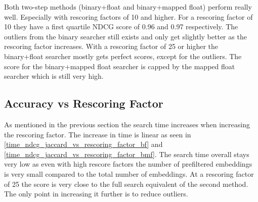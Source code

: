 Both two-step methods (binary+float and binary+mapped float) perform really well. Especially with rescoring factors of 10 and higher. For a rescoring factor of 10 they have a first quartile NDCG score of 0.96 and 0.97 respectively. The outliers from the binary searcher still exists and only get slightly better as the rescoring factor increases.
With a rescoring factor of 25 or higher the binary+float searcher mostly gets perfect scores, except for the outliers. The score for the binary+mapped float searcher is capped by the mapped float searcher which is still very high.

\subsection{Accuracy vs Rescoring Factor}

As mentioned in the previous section the search time increases when increasing the rescoring factor. The increase in time is linear as seen in \autoref{time_ndcg_jaccard_vs_rescoring_factor_bf} and \autoref{time_ndcg_jaccard_vs_rescoring_factor_bmf}. The search time overall stays very low as even with high rescore factors the number of prefiltered embeddings is very small compared to the total number of embeddings. At a rescoring factor of 25 the score is very close to the full search equivalent of the second method. The only point in increasing it further is to reduce outliers.
